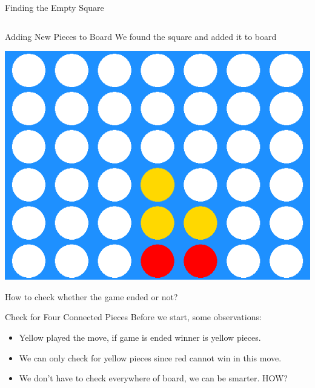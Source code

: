         \begin{frame}{Finding the Empty Square}
            \Large
            \inputminted[frame=single,framesep=2pt,firstline=6]{python3}{code-examples/finding_square.py}
        \end{frame}

        \begin{frame}{Adding New Pieces to Board}
            \LARGE
            We found the square and added it to board
            \begin{center}
                \includegraphics[height=0.6\textheight]{images/connect_four_board_2.png}\\
            \end{center}
            \vspace{-2mm}
            How to check whether the game ended or not?
        \end{frame}

        \begin{frame}{Check for Four Connected Pieces}
            \huge
            Before we start, some observations:
            \pause
            \begin{itemize}
                \item Yellow played the move, if game is ended winner is yellow pieces.
                \pause
                \item We can only check for yellow pieces since red cannot win in this move.
                \pause
                \item We don't have to check everywhere of board, we can be smarter. HOW?
            \end{itemize}
        \end{frame}

